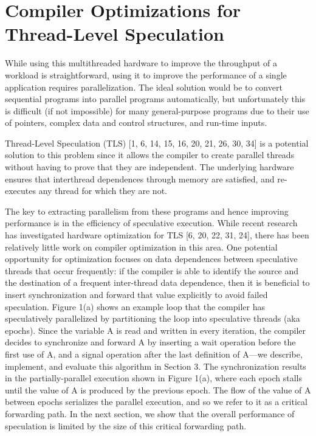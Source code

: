 \newpage 

\section{Compiler Optimizations for Thread-Level Speculation}


While
using this multithreaded hardware to improve the throughput of a
workload is straightforward, using it to improve the performance
of a single application requires parallelization. The ideal solution
would be to convert sequential programs into parallel programs automatically, but unfortunately this is difficult (if not impossible) for
many general-purpose programs due to their use of pointers, complex data and control structures, and run-time inputs.


Thread-Level Speculation (TLS) [1, 6, 14, 15, 16, 20, 21, 26,
30, 34] is a potential solution to this problem since it allows the
compiler to create parallel threads without having to prove that
they are independent. The underlying hardware ensures that interthread 
dependences through memory are satisfied, and re-executes
any thread for which they are not.

The key to extracting parallelism from these programs and hence
improving performance is in the efficiency of speculative execution. 
While recent research has investigated hardware optimization
for TLS [6, 20, 22, 31, 24], there has been relatively little work
on compiler optimization in this area. One potential opportunity for optimization focuses on data dependences between speculative
threads that occur frequently: if the compiler is able to identify the
source and the destination of a frequent inter-thread data dependence, then it is beneficial to insert synchronization and forward
that value explicitly to avoid failed speculation. Figure 1(a) shows
an example loop that the compiler has speculatively parallelized by
partitioning the loop into speculative threads (aka epochs). Since
the variable A is read and written in every iteration, the compiler decides to synchronize and forward A by inserting a wait operation
before the first use of A, and a signal operation after the last definition of A—we describe, implement, and evaluate this algorithm
in Section 3. The synchronization results in the partially-parallel
execution shown in Figure 1(a), where each epoch stalls until the
value of A is produced by the previous epoch. The flow of the value
of A between epochs serializes the parallel execution, and so we refer to it as a critical forwarding path. In the next section, we show
that the overall performance of speculation is limited by the size of
this critical forwarding path.
